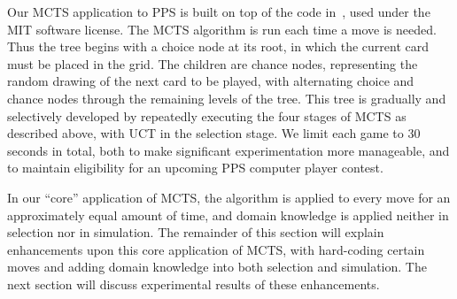\documentclass[letterpaper]{article}
\begin{document}

Our MCTS application to PPS is built on top of the code in~\cite{hughart2012uct}, used under the MIT software license. The MCTS algorithm is run each time a move is needed. Thus the tree begins with a choice node at its root, in which the current card must be placed in the grid. The children are chance nodes, representing the random drawing of the next card to be played, with alternating choice and chance nodes through the remaining levels of the tree. This tree is gradually and selectively developed by repeatedly executing the four stages of MCTS as described above, with UCT in the selection stage. We limit each game to 30 seconds in total, both to make significant experimentation more manageable, and to maintain eligibility for an upcoming PPS computer player contest. 

In our ``core'' application of MCTS, the algorithm is applied to every move for an approximately equal amount of time, and domain knowledge is applied neither in selection nor in simulation. The remainder of this section will explain enhancements upon this core application of MCTS, with hard-coding certain moves and adding domain knowledge into both selection and simulation. The next section will discuss experimental results of these enhancements.

\end{document}
